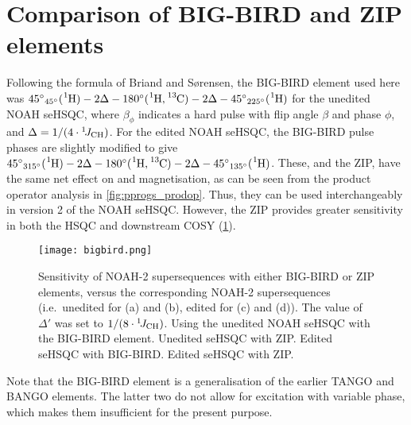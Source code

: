 \section{Comparison of BIG-BIRD and ZIP elements}

Following the formula of Briand and S\o{}rensen,\autocite{Briand1997JMR} the BIG-BIRD element used here was ${45^\circ}_{45^\circ}(\proton{}) - 2\Delta - 180^\circ(\proton{},\carbon{}) - 2\Delta - {45^\circ}_{225^\circ}(\proton{})$ for the unedited NOAH seHSQC, where $\beta_\phi$ indicates a hard pulse with flip angle $\beta$ and phase $\phi$, and $\Delta = 1/(4\cdot\onejch)$.
For the edited NOAH seHSQC, the BIG-BIRD pulse phases are slightly modified to give ${45^\circ}_{315^\circ}(\proton{}) - 2\Delta - 180^\circ(\proton{},\carbon{}) - 2\Delta - {45^\circ}_{135^\circ}(\proton{})$.
These, and the ZIP, have the same net effect on  and  magnetisation, as can be seen from the product operator analysis in \cref{fig:pprogs_prodop}.
Thus, they can be used interchangeably in version 2 of the NOAH seHSQC.
However, the ZIP provides greater sensitivity in both the HSQC and downstream COSY (\cref{fig:bigbird}).

\begin{figure}
    \centering
    \texttt{[image: bigbird.png]}
    {\label{fig:bigbird_unedited_bigbird}}
    {\label{fig:bigbird_unedited_zip}}
    {\label{fig:bigbird_edited_bigbird}}
    {\label{fig:bigbird_edited_zip}}
    \caption{
        Sensitivity of NOAH-2  supersequences with either BIG-BIRD or ZIP elements, versus the corresponding NOAH-2  supersequences (i.e.\ unedited for (a) and (b), edited for (c) and (d)).
        The value of $\Delta'$ was set to $1/(8 \cdot \onejch)$.
        \textbf{} Using the unedited NOAH seHSQC with the BIG-BIRD element.
        \textbf{} Unedited seHSQC with ZIP.
        \textbf{} Edited seHSQC with BIG-BIRD.
        \textbf{} Edited seHSQC with ZIP.
        \andro{}
    }
    \label{fig:bigbird}
\end{figure}

Note that the BIG-BIRD element is a generalisation of the earlier TANGO\autocite{Wimperis1984JMR} and BANGO\autocite{Sorensen1994BMR} elements.
The latter two do not allow for excitation with variable phase, which makes them insufficient for the present purpose.

